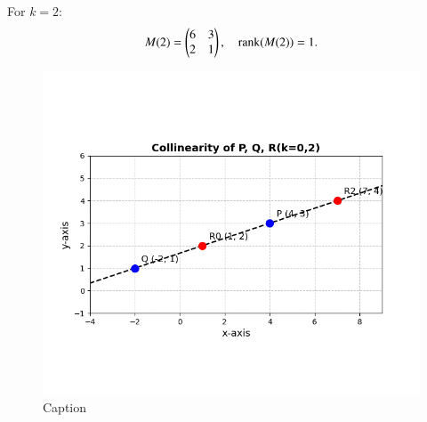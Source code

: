 \documentclass[journal]{article}
\begin{document}
For $k=2$:
\begin{align}
M(2) = \begin{pmatrix}6 & 3 \\ 2 & 1\end{pmatrix}, \quad \text{rank}(M(2))=1.
\end{align}
\begin{figure}
    \centering
    \includegraphics[width=1.0\linewidth]{figs/fig 1.png}
    \caption{Caption}
    \label{fig:placeholder}
\end{figure}
\end{document}
